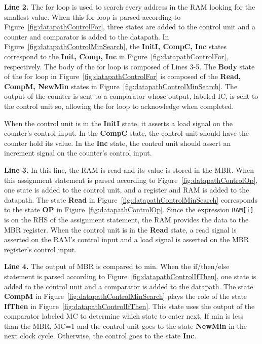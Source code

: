 \textbf{ Line 2.} The for loop is used to search every address in the 
RAM looking for the smallest value.  When this for loop is parsed 
according to Figure~\ref{fig:datapathControlFor}, three states are added to
the control unit and a counter and comparator is added to the datapath. In 
Figure~\ref{fig:datapathControlMinSearch}, the \textbf{ InitI, CompC, Inc} states correspond 
to the \textbf{ Init, Comp, Inc} in Figure~\ref{fig:datapathControlFor}, respectively. The 
body of the for loop is composed of Lines 3-5.  The \textbf{ Body} state of 
the for loop in Figure~\ref{fig:datapathControlFor} is composed of the 
\textbf{ Read, CompM, NewMin} states in Figure~\ref{fig:datapathControlMinSearch}.  The
output of the counter is sent to a comparator whose output, labeled
IC, is sent to the control unit so, allowing the for loop to acknowledge when
completed. 

When the control unit is in the \textbf{ InitI} state, it asserts a load
signal on the counter's control input.  In the \textbf{ CompC} state, the control unit
should have the counter hold its value.  In the \textbf{ Inc} state, the control
unit should assert an increment signal on the counter's control input.

\textbf{ Line 3.} In this line, the RAM is read and its value is stored in the MBR.  When this
assignment statement is parsed according to Figure~\ref{fig:datapathControlOp}, one state is added 
to the control unit, and a register and RAM is added to the 
datapath. The state \textbf{ Read} in Figure~\ref{fig:datapathControlMinSearch} corresponds to the state
\textbf{ OP} in Figure~\ref{fig:datapathControlOp}.  Since the expression \verb+RAM[i]+ is on the RHS
of the assignment statement, the RAM provides the data to the 
MBR register.  When the control unit is in the \textbf{ Read} state, 
a read signal is asserted on the RAM's control input and a load signal is asserted 
on the MBR register's control input.

\textbf{ Line 4.}  The output of MBR is compared to min.  When the if/then/else statement
is parsed according to Figure~\ref{fig:datapathControlIfThen}, one state is added
to the control unit and a comparator is added to the datapath.  The state \textbf{ CompM} in 
Figure~\ref{fig:datapathControlMinSearch} plays the role of the state \textbf{ IfThen} in Figure~\ref{fig:datapathControlIfThen}.
This state uses the output of the comparator labeled MC to determine which 
state to enter next.  If min is less than the MBR, MC=1 and the 
control unit 
goes to the state \textbf{ NewMin} in the next clock cycle.  Otherwise, the control goes 
to the state \textbf{ Inc}.

